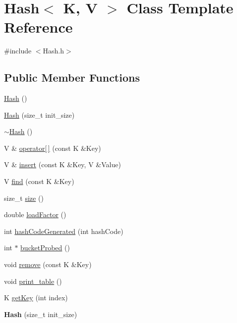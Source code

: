 \hypertarget{classHash}{}\section{Hash$<$ K, V $>$ Class Template Reference}
\label{classHash}


{\ttfamily \#include $<$Hash.\+h$>$}

\subsection*{Public Member Functions}
\begin{DoxyCompactItemize}
\item 
\hyperlink{classHash_a37942689c0b3909fd9d4223e972b3214}{Hash} ()
\item 
\hyperlink{classHash_af865b46873f217c0a6f4c216697ad8ac}{Hash} (size\+\_\+t init\+\_\+size)
\item 
\hyperlink{classHash_aa4cf3d3f9f57ae71aaa4d80d31d08551}{$\sim$\+Hash} ()
\item 
V \& \hyperlink{classHash_a9e05844661ba3960f6381148b56f5cf7}{operator\mbox{[}$\,$\mbox{]}} (const K \&Key)
\item 
V \& \hyperlink{classHash_aee6a11f986c5924af8dd95f5d4f0e945}{insert} (const K \&Key, V \&Value)
\item 
V \hyperlink{classHash_a5785086ca51aa08e7175e97e4a853334}{find} (const K \&Key)
\item 
size\+\_\+t \hyperlink{classHash_abd05714536838b5bd2a393036c7437db}{size} ()
\item 
double \hyperlink{classHash_a6b0680a8de89ffa05aefbe05d0e6d738}{load\+Factor} ()
\item 
int \hyperlink{classHash_addea524e1e28ddc1731287f5cbc11c71}{hash\+Code\+Generated} (int hash\+Code)
\item 
int $\ast$ \hyperlink{classHash_af61bd05265387d4cf9930cbfd9cff57e}{bucket\+Probed} ()
\item 
void \hyperlink{classHash_a453733aa477944c75e30f629f12e7dd7}{remove} (const K \&Key)
\item 
void \hyperlink{classHash_a00bb410aea1cce94e1766d70e93534b4}{print\+\_\+table} ()
\item 
K \hyperlink{classHash_a3e5bfab4dde4f0157d7b689d599ab294}{get\+Key} (int index)
\item 
\hypertarget{classHash_af865b46873f217c0a6f4c216697ad8ac}{}{\bfseries Hash} (size\+\_\+t init\+\_\+size)\label{classHash_af865b46873f217c0a6f4c216697ad8ac}


\end{DoxyCompactItemize}
